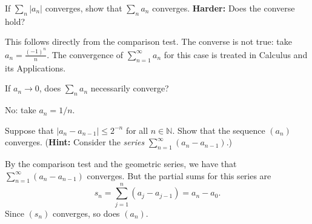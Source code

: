 \documentclass[11pt,dvipsnames]{book}
\numberwithin{figure}{section} %
\numberwithin{table}{section} %
\begin{document}
\begin{exercise}
If $\sum_n |a_n|$ converges, show that $\sum_n a_n$ converges. {\bf Harder:} Does the converse hold?
\begin{solution}
This follows directly from the comparison test. The converse is not true: take $a_n = \frac{(-1)^n}{n}$. The convergence of $\sum_{n=1}^\infty a_n$ for this case is treated in Calculus and its Applications.
\end{solution}
\end{exercise}

\begin{exercise} If $a_n \to 0$,
does $\sum_n a_n$ necessarily converge?
\begin{solution}
No: take $a_n = 1/n$.
\end{solution}
\end{exercise}

\begin{exercise}
Suppose that $|a_n - a_{n-1}| \leq 2^{-n}$ for all $n \in \mathbb{N}$. Show that the sequence $(a_n)$ converges. ({\bf Hint:} Consider the {\em series} $\sum_{n=1}^\infty (a_n - a_{n-1})$.)
\begin{solution}
By the comparison test and the geometric series, we have that $\sum_{n=1}^\infty (a_n - a_{n-1})$ converges.
But the partial sums for this series are
\[ s_n = \sum_{j=1}^n (a_j - a_{j-1}) = a_n - a_0.\]
Since $(s_n)$ converges, so does $(a_n)$.
\end{solution}
\end{exercise}
\end{document}
